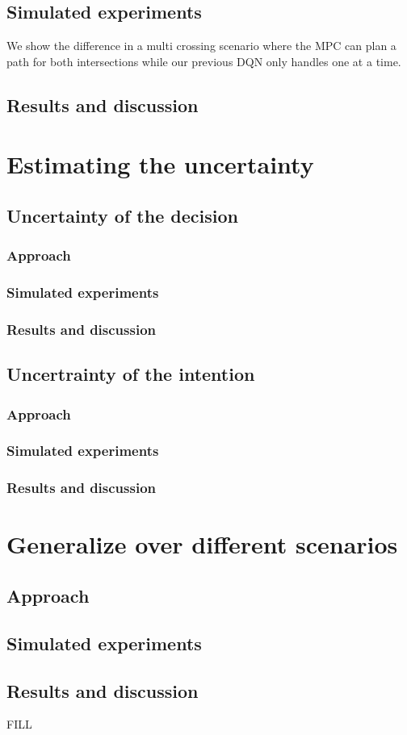 \section{Simulated experiments}
We show the difference in a multi crossing scenario where the MPC can plan a path for both intersections while our previous DQN only handles one at a time. 

\section{Results and discussion}

\chapter{Estimating the uncertainty}

\section{Uncertainty of the decision}
\subsection{Approach}
\subsection{Simulated experiments}
\subsection{Results and discussion}

\section{Uncertrainty of the intention}
\subsection{Approach}
\subsection{Simulated experiments}
\subsection{Results and discussion}


\chapter{Generalize over different scenarios}
\section{Approach}
\section{Simulated experiments}
\section{Results and discussion}
FILL